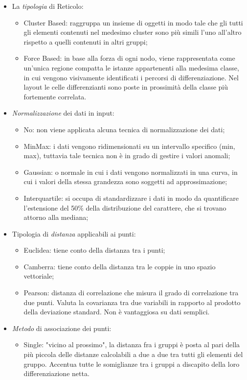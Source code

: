 \begin{itemize}
\item La \textit{tipologia} di Reticolo:
\begin{itemize}
\item Cluster Based: raggruppa un insieme di oggetti in modo tale che gli tutti gli elementi contenuti nel medesimo cluster sono pi\`u simili l'uno all'altro rispetto a quelli contenuti in altri gruppi;
\item Force Based: in base alla forza di ogni nodo, viene rappresentata come un'unica regione compatta le istanze appartenenti alla medesima classe, in cui vengono visivamente identificati i percorsi di differenziazione. Nel layout le celle differenzianti sono poste in prossimit\`a della classe pi\`u fortemente correlata.
\end{itemize}
\item \textit{Normalizzazione} dei dati in input:
\begin{itemize}
\item No: non viene applicata alcuna tecnica di normalizzazione dei dati;
\item MinMax: i dati vengono ridimensionati su un intervallo specifico (min, max), tuttavia tale tecnica non \`e in grado di gestire i valori anomali;
\item Gaussian: o normale in cui i dati vengono normalizzati in una curva, in cui i valori della stessa grandezza sono soggetti ad approssimazione;
\item Interquartile: si occupa di standardizzare i dati in modo da quantificare l'estensione del 50\% della distribuzione del carattere, che si trovano attorno alla mediana;
\end{itemize}
\item Tipologia di \textit{distanza} applicabili ai punti:
\begin{itemize}
\item Euclidea: tiene conto della distanza tra i punti;
\item Camberra: tiene conto della distanza tra le coppie in uno spazio vettoriale;
\item Pearson: distanza di correlazione che misura il grado di correlazione tra due punti. Valuta la covarianza tra due variabili in rapporto al prodotto della deviazione standard. Non \`e vantaggiosa su dati semplici.
\end{itemize}
\item \textit{Metodo} di associazione dei punti:
\begin{itemize}
\item Single: "vicino al prossimo", la distanza fra i gruppi \`e posta al pari della pi\`u piccola delle distanze calcolabili a due a due tra tutti gli elementi del gruppo. Accentua tutte le somiglianze tra i gruppi a discapito  della loro differenziazione netta.

\end{itemize}
\end{itemize}
